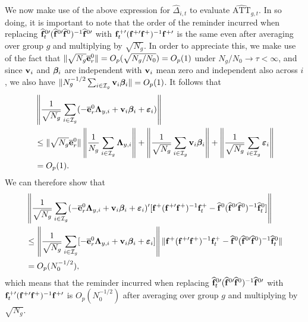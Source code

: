 \documentclass[12pt,fleqn]{article}
\begin{document}
We now make use of the above expression for $\widehat \Delta_{i,t}$ to evaluate $\widehat{\mathrm{ATT}}_{g,t}$. In so doing, it is important to note that the order of the reminder incurred when replacing $\widehat{\mathbf{f}}_t^{0\prime}(\widehat{\mathbf{f}}^{0\prime}\widehat{\mathbf{f}}^0)^{-1}\widehat{\mathbf{f}}^{0\prime}$ with $\mathbf{f}_t^{+\prime}(\mathbf{f}^{+\prime}\mathbf{f}^+)^{-1}\mathbf{f}^{+\prime}$ is the same even after averaging over group $g$ and multiplying by $\sqrt{N_g}$. In order to appreciate this, we make use of the fact that $\|\sqrt{N_g}\overline{\mathbf{e}}_{r}^0\|= O_p(\sqrt{N_g/N_0}) = O_p(1)$ under $N_g/N_0 \to \tau < \infty$, and since $\mathbf{v}_{i}$ and $\boldsymbol{\beta}_i$ are independent with $\mathbf{v}_i$ mean zero and independent also across $i$, we also have $\|N_g^{-1/2}\sum_{i\in \mathcal{I}_g} \mathbf{v}_{i}\boldsymbol{\beta}_i\| = O_p(1)$. It follows that
\begin{align}
& \left\|\frac{1}{\sqrt{N_g}}\sum_{i\in \mathcal{I}_g} (- \overline{\mathbf{e}}_{r}^0\boldsymbol{\Lambda}_{y,i} + \mathbf{v}_i\boldsymbol{\beta}_i+  \boldsymbol{\varepsilon}_{i} ) \right\|\notag\\
& \leq \|\sqrt{N_g}\overline{\mathbf{e}}_{r}^0\|\left\|\frac{1}{N_g} \sum_{i \in \mathcal{I}_g} \boldsymbol{\Lambda}_{y,i} \right\| + \left\| \frac{1}{\sqrt{N_g}} \sum_{i\in \mathcal{I}_g} \mathbf{v}_{i}\boldsymbol{\beta}_i \right\| +  \left\|\frac{1}{\sqrt{N_g}} \sum_{i \in \mathcal{I}_g} \boldsymbol{\varepsilon}_{i}\right\|\notag\\
& =O_p(1).
\end{align}
We can therefore show that
\begin{align}
& \left\|\frac{1}{\sqrt{N_g}}\sum_{i \in \mathcal{I}_g} ( - \overline{\mathbf{e}}_{r}^0\boldsymbol{\Lambda}_{y,i} + \mathbf{v}_i\boldsymbol{\beta}_i+  \boldsymbol{\varepsilon}_{i} )'[\mathbf{f}^{+} (\mathbf{f}^{+\prime}\mathbf{f}^+)^{-1}\mathbf{f}_t^+ - \widehat{\mathbf{f}}^{0} (\widehat{\mathbf{f}}^{0\prime}\widehat{\mathbf{f}}^0)^{-1}\widehat{\mathbf{f}}_t^0] \right\| \notag\\
& \leq
\left\| \frac{1}{\sqrt{N_g}}\sum_{i \in \mathcal{I}_g}[ - \overline{\mathbf{e}}_{r}^0\boldsymbol{\Lambda}_{y,i} + \mathbf{v}_i\boldsymbol{\beta}_i+  \boldsymbol{\varepsilon}_{i} ]\right\| \|\mathbf{f}^{+} (\mathbf{f}^{+\prime}\mathbf{f}^+)^{-1}\mathbf{f}_t^+ - \widehat{\mathbf{f}}^{0} (\widehat{\mathbf{f}}^{0\prime}\widehat{\mathbf{f}}^0)^{-1}\widehat{\mathbf{f}}_t^0\|\notag\\
& = O_p(N_0^{-1/2}),
\end{align}
which means that the reminder incurred when replacing $\widehat{\mathbf{f}}_t^{0\prime}(\widehat{\mathbf{f}}^{0\prime}\widehat{\mathbf{f}}^0)^{-1}\widehat{\mathbf{f}}^{0\prime}$ with $\mathbf{f}_t^{+\prime}(\mathbf{f}^{+\prime}\mathbf{f}^+)^{-1}\mathbf{f}^{+\prime}$ is $O_p(N_0^{-1/2})$ after averaging over group $g$ and multiplying by $\sqrt{N_g}$.
\end{document}
